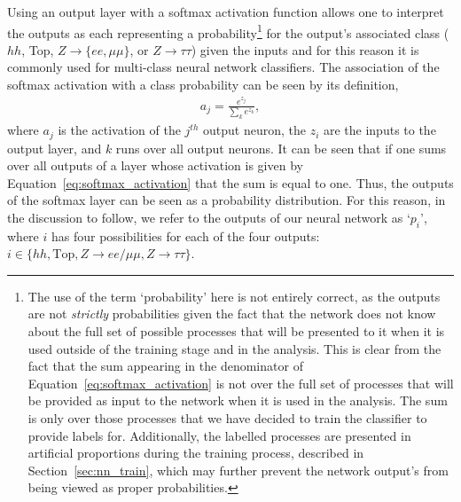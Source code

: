 Using an output layer with a softmax activation function allows one to interpret the outputs as
each representing a probability\footnote{
The use of the term `probability' here is not entirely correct, as the outputs are not \textit{strictly} probabilities given the fact that the network
does not know about the full set of possible processes that will be presented to it when it is used outside
of the training stage and in the analysis.
This is clear from the fact that the sum appearing in the denominator of Equation~\ref{eq:softmax_activation}
is not over the full set of processes that will be provided as input to the network when it is used
in the analysis.
The sum is only over those processes that we have decided to train the classifier to provide labels for.
Additionally, the labelled
processes are presented in artificial proportions during the training process, described in Section~\ref{sec:nn_train},
which may further prevent the network output's from being viewed as proper probabilities.
}
for the output's associated class ($hh$, Top, $Z \rightarrow \{ee,\mu\mu\}$,
or $Z \rightarrow \tau\tau$) given the inputs and for this reason it is commonly used for multi-class
neural network classifiers.
The association of the softmax activation with a class probability can be seen by its definition,
\begin{align}
    a_j = \frac{ e^{z_j} } { \sum\limits_k e ^{z_k} },
    \label{eq:softmax_activation}
\end{align}
where $a_j$ is the activation of the $j^{th}$ output neuron, the $z_i$ are the inputs to the output layer,
and $k$ runs over all output neurons.
It can be seen that if one sums over all outputs of a layer whose activation is given by Equation~\ref{eq:softmax_activation}
that the sum is equal to one.
Thus, the outputs of the softmax layer can be seen as a probability distribution.
For this reason, in the discussion to follow, we refer to the outputs of our neural network as `$p_i$',
where $i$ has four possibilities for each of the four outputs: $i \in \{ hh, \text{Top}, Z\rightarrow ee/\mu\mu, Z\rightarrow \tau\tau \}$.

